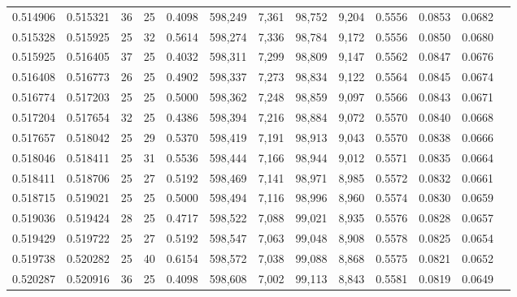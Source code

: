 \begin{tabular}{rrrrrrrrrrrrr}
0.514906 & 0.515321 &    36 &  25 &                                     0.4098 & 598,249 &   7,361 &  98,752 &   9,204 & 0.5556 & 0.0853 & 0.0682 \\
0.515328 & 0.515925 &    25 &  32 &                                     0.5614 & 598,274 &   7,336 &  98,784 &   9,172 & 0.5556 & 0.0850 & 0.0680 \\
0.515925 & 0.516405 &    37 &  25 &                                     0.4032 & 598,311 &   7,299 &  98,809 &   9,147 & 0.5562 & 0.0847 & 0.0676 \\
0.516408 & 0.516773 &    26 &  25 &                                     0.4902 & 598,337 &   7,273 &  98,834 &   9,122 & 0.5564 & 0.0845 & 0.0674 \\
0.516774 & 0.517203 &    25 &  25 &                                     0.5000 & 598,362 &   7,248 &  98,859 &   9,097 & 0.5566 & 0.0843 & 0.0671 \\
0.517204 & 0.517654 &    32 &  25 &                                     0.4386 & 598,394 &   7,216 &  98,884 &   9,072 & 0.5570 & 0.0840 & 0.0668 \\
0.517657 & 0.518042 &    25 &  29 &                                     0.5370 & 598,419 &   7,191 &  98,913 &   9,043 & 0.5570 & 0.0838 & 0.0666 \\
0.518046 & 0.518411 &    25 &  31 &                                     0.5536 & 598,444 &   7,166 &  98,944 &   9,012 & 0.5571 & 0.0835 & 0.0664 \\
0.518411 & 0.518706 &    25 &  27 &                                     0.5192 & 598,469 &   7,141 &  98,971 &   8,985 & 0.5572 & 0.0832 & 0.0661 \\
0.518715 & 0.519021 &    25 &  25 &                                     0.5000 & 598,494 &   7,116 &  98,996 &   8,960 & 0.5574 & 0.0830 & 0.0659 \\
0.519036 & 0.519424 &    28 &  25 &                                     0.4717 & 598,522 &   7,088 &  99,021 &   8,935 & 0.5576 & 0.0828 & 0.0657 \\
0.519429 & 0.519722 &    25 &  27 &                                     0.5192 & 598,547 &   7,063 &  99,048 &   8,908 & 0.5578 & 0.0825 & 0.0654 \\
0.519738 & 0.520282 &    25 &  40 &                                     0.6154 & 598,572 &   7,038 &  99,088 &   8,868 & 0.5575 & 0.0821 & 0.0652 \\
0.520287 & 0.520916 &    36 &  25 &                                     0.4098 & 598,608 &   7,002 &  99,113 &   8,843 & 0.5581 & 0.0819 & 0.0649 \\

\end{tabular}
